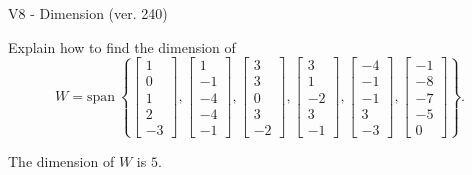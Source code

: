 \begin{exercise}
  \begin{exerciseTitle}V8 - Dimension (ver. 240)\end{exerciseTitle}
  \begin{exerciseStatement}
    Explain how to find the dimension of 
\[W=\mathrm{span}\ \left\{\left[\begin{array}{r}
1 \\
0 \\
1 \\
2 \\
-3
\end{array}\right] , \left[\begin{array}{r}
1 \\
-1 \\
-4 \\
-4 \\
-1
\end{array}\right] , \left[\begin{array}{r}
3 \\
3 \\
0 \\
3 \\
-2
\end{array}\right] , \left[\begin{array}{r}
3 \\
1 \\
-2 \\
3 \\
-1
\end{array}\right] , \left[\begin{array}{r}
-4 \\
-1 \\
-1 \\
3 \\
-3
\end{array}\right] , \left[\begin{array}{r}
-1 \\
-8 \\
-7 \\
-5 \\
0
\end{array}\right]\right\}.\]



  \end{exerciseStatement}
  \begin{exerciseAnswer}
   The dimension of \(W\) is  \(5\).
  


  \end{exerciseAnswer}
\end{exercise}